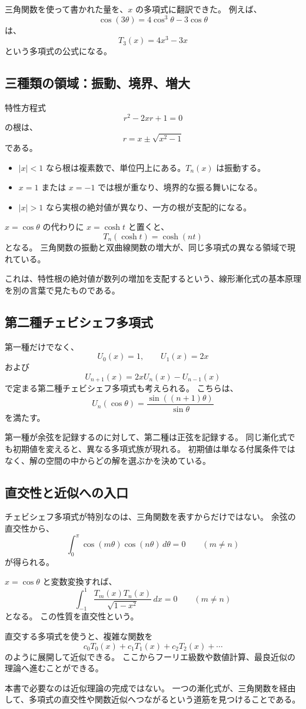 三角関数を使って書かれた量を、$x$ の多項式に翻訳できた。
例えば、
\[
  \cos(3\theta)=4\cos^3\theta-3\cos\theta
\]
は、
\[
  T_3(x)=4x^3-3x
\]
という多項式の公式になる。

\subsection{三種類の領域：振動、境界、増大}

特性方程式
\[
  r^2-2xr+1=0
\]
の根は、
\[
  r=x\pm\sqrt{x^2-1}
\]
である。

\begin{itemize}
  \item $|x|<1$ なら根は複素数で、単位円上にある。$T_n(x)$ は振動する。
  \item $x=1$ または $x=-1$ では根が重なり、境界的な振る舞いになる。
  \item $|x|>1$ なら実根の絶対値が異なり、一方の根が支配的になる。
\end{itemize}

$x=\cos\theta$ の代わりに $x=\cosh t$ と置くと、
\[
  T_n(\cosh t)=\cosh(nt)
\]
となる。
三角関数の振動と双曲線関数の増大が、同じ多項式の異なる領域で現れている。

これは、特性根の絶対値が数列の増加を支配するという、線形漸化式の基本原理を別の言葉で見たものである。

\subsection{第二種チェビシェフ多項式}

第一種だけでなく、\[
  U_0(x)=1,\qquad U_1(x)=2x
\]
および
\[
  U_{n+1}(x)=2xU_n(x)-U_{n-1}(x)
\]
で定まる第二種チェビシェフ多項式も考えられる。
こちらは、
\[
  U_n(\cos\theta)
  =\frac{\sin((n+1)\theta)}{\sin\theta}
\]
を満たす。

第一種が余弦を記録するのに対して、第二種は正弦を記録する。
同じ漸化式でも初期値を変えると、異なる多項式族が現れる。
初期値は単なる付属条件ではなく、解の空間の中からどの解を選ぶかを決めている。

\subsection{直交性と近似への入口}

チェビシェフ多項式が特別なのは、三角関数を表すからだけではない。
余弦の直交性から、
\[
  \int_0^\pi\cos(m\theta)\cos(n\theta)\,d\theta=0
  \qquad(m\neq n)
\]
が得られる。

$x=\cos\theta$ と変数変換すれば、
\[
  \int_{-1}^{1}
  \frac{T_m(x)T_n(x)}{\sqrt{1-x^2}}\,dx=0
  \qquad(m\neq n)
\]
となる。
この性質を直交性という。

直交する多項式を使うと、複雑な関数を
\[
  c_0T_0(x)+c_1T_1(x)+c_2T_2(x)+\cdots
\]
のように展開して近似できる。
ここからフーリエ級数や数値計算、最良近似の理論へ進むことができる。

本書で必要なのは近似理論の完成ではない。
一つの漸化式が、三角関数を経由して、多項式の直交性や関数近似へつながるという道筋を見つけることである。

\clearpage
